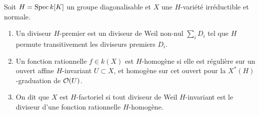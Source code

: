\begin{defn}
Soit $H=\operatorname{Spec} k[K]$ un groupe diagonalisable et $X$ une $H$-variété irréductible et normale.
\begin{enumerate}
\item Un diviseur $H$-premier est un diviseur de Weil non-nul $\sum_i D_i$  tel que $H$ permute transitivement les diviseurs premiers $D_i$.
\item Un fonction rationnelle $f\in k(X)$ est $H$-homogène si elle est régulière sur un ouvert affine $H$-invariant $U\subset X$, et homogène sur cet ouvert pour la $X^*(H)$-graduation de $\mathcal{O}(U)$.
\item On dit que $X$ est $H$-factoriel si tout diviseur de Weil $H$-invariant est le diviseur d'une fonction rationnelle $H$-homogène.
\end{enumerate}
\end{defn}


